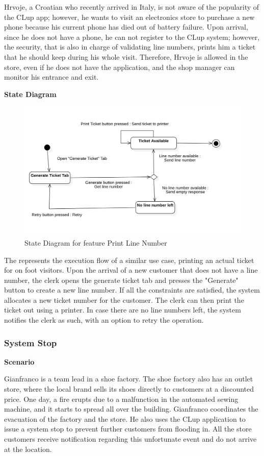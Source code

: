 Hrvoje, a Croatian who recently arrived in Italy, is not aware of the popularity of the CLup app; however, he wants to visit an electronics store to purchase a new phone because his current phone has died out of battery failure.
Upon arrival, since he does not have a phone, he can not register to the CLup system; however, the security, that is also in charge of validating line numbers, prints him a ticket that he should keep during his whole visit.
Therefore, Hrvoje is allowed in the store, even if he does not have the application, and the shop manager can monitor his entrance and exit.

\textbf{State Diagram}

\begin{figure}[H]
    \centering
    \includegraphics[height=0.4\textwidth]{Images/StateCharts/PrintTicket.png}
    \caption{State Diagram for feature Print Line Number}
    \label{fig:SDPrintLine}
\end{figure}

The  represents the execution flow of a similar use case, printing an actual ticket for on foot visitors.
Upon the arrival of a new customer that does not have a line number, the clerk opens the generate ticket tab and presses the "Generate" button to create a new line number.
If all the constraints are satisfied, the system allocates a new ticket number for the customer.
The clerk can then print the ticket out using a printer.
In case there are no line numbers left, the system notifies the clerk as such, with an option to retry the operation.

\subsubsection{System Stop}

\textbf{Scenario}

Gianfranco is a team lead in a shoe factory.
The shoe factory also has an outlet store, where the local brand sells its shoes directly to customers at a discounted price.
One day, a fire erupts due to a malfunction in the automated sewing machine, and it starts to spread all over the building.
Gianfranco coordinates the evacuation of the factory and the store.
He also uses the CLup application to issue a system stop to prevent further customers from flooding in.
All the store customers receive notification regarding this unfortunate event and do not arrive at the location.

